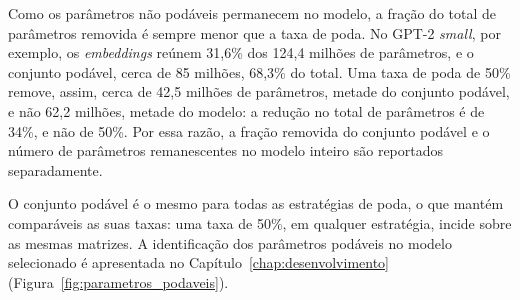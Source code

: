 Como os parâmetros não podáveis permanecem no modelo, a fração do total de parâmetros
removida é sempre menor que a taxa de poda. No GPT-2 \textit{small}, por exemplo, os
\textit{embeddings} reúnem 31,6\% dos 124,4 milhões de parâmetros, e o conjunto podável,
cerca de 85 milhões, 68,3\% do total. Uma taxa de poda de 50\% remove, assim, cerca de 42,5
milhões de parâmetros, metade do conjunto podável, e não 62,2 milhões, metade do modelo: a
redução no total de parâmetros é de 34\%, e não de 50\%. Por essa razão, a fração removida
do conjunto podável e o número de parâmetros remanescentes no modelo inteiro
são reportados separadamente.

O conjunto podável é o mesmo para todas as estratégias de poda, o que mantém comparáveis as
suas taxas: uma taxa de 50\%, em qualquer estratégia, incide sobre as mesmas matrizes. A
identificação dos parâmetros podáveis no modelo selecionado é apresentada no
Capítulo~\ref{chap:desenvolvimento} (Figura~\ref{fig:parametros_podaveis}).

